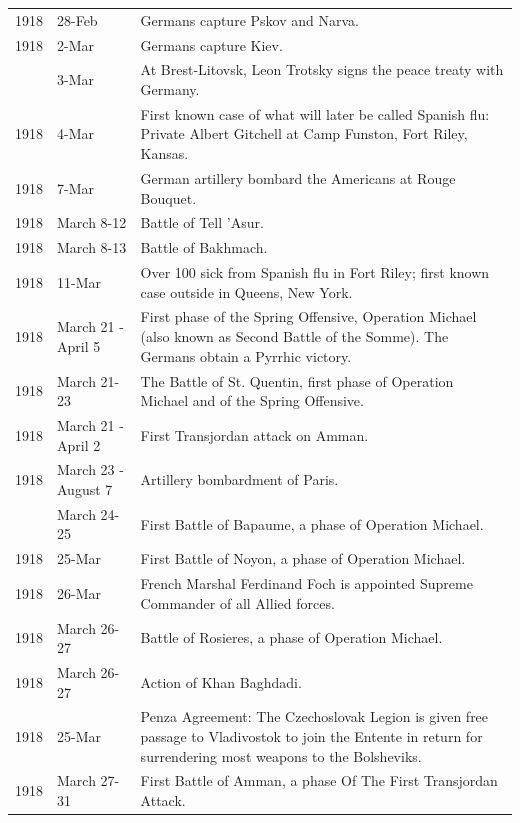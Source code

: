 \documentclass[
  openany]{book}
\begin{document}
\begin{longtable}[t]{rl>{\raggedright\arraybackslash}p{22em}}
1918 & 28-Feb & Germans capture Pskov and Narva.\\
\rowcolor{gray!6}  1918 & 2-Mar & Germans capture Kiev.\\
\addlinespace
1918 & 3-Mar & At Brest-Litovsk, Leon Trotsky signs the peace treaty with Germany.\\
\rowcolor{gray!6}  1918 & 4-Mar & First known case of what will later be called Spanish flu: Private Albert Gitchell at Camp Funston, Fort Riley, Kansas.\\
1918 & 7-Mar & German artillery bombard the Americans at Rouge Bouquet.\\
\rowcolor{gray!6}  1918 & March 8-12 & Battle of Tell 'Asur.\\
1918 & March 8-13 & Battle of Bakhmach.\\
\addlinespace
\rowcolor{gray!6}  1918 & 11-Mar & Over 100 sick from Spanish flu in Fort Riley; first known case outside in Queens, New York.\\
1918 & March 21 - April 5 & First phase of the Spring Offensive, Operation Michael (also known as Second Battle of the Somme). The Germans obtain a Pyrrhic victory.\\
\rowcolor{gray!6}  1918 & March 21-23 & The Battle of St. Quentin, first phase of Operation Michael and of the Spring Offensive.\\
1918 & March 21 - April 2 & First Transjordan attack on Amman.\\
\rowcolor{gray!6}  1918 & March 23 - August 7 & Artillery bombardment of Paris.\\
\addlinespace
1918 & March 24-25 & First Battle of Bapaume, a phase of Operation Michael.\\
\rowcolor{gray!6}  1918 & 25-Mar & First Battle of Noyon, a phase of Operation Michael.\\
1918 & 26-Mar & French Marshal Ferdinand Foch is appointed Supreme Commander of all Allied forces.\\
\rowcolor{gray!6}  1918 & March 26-27 & Battle of Rosieres, a phase of Operation Michael.\\
1918 & March 26-27 & Action of Khan Baghdadi.\\
\addlinespace
\rowcolor{gray!6}  1918 & 25-Mar & Penza Agreement: The Czechoslovak Legion is given free passage to Vladivostok to join the Entente in return for surrendering most weapons to the Bolsheviks.\\
1918 & March 27-31 & First Battle of Amman, a phase Of The First Transjordan Attack.\\

\end{longtable}
\end{document}
